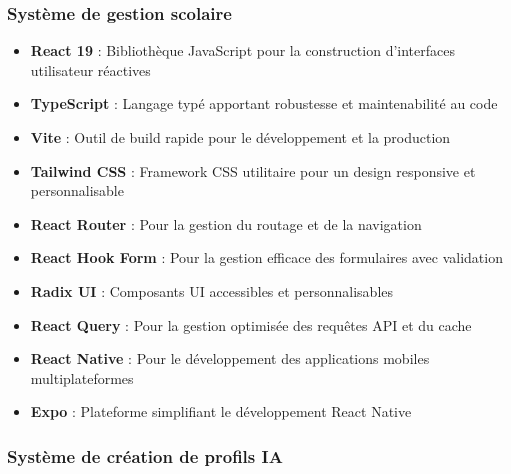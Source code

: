 \subsubsection{Système de gestion scolaire}

\begin{itemize}
  \item \textbf{React 19} : Bibliothèque JavaScript pour la construction d'interfaces utilisateur réactives
  
  \item \textbf{TypeScript} : Langage typé apportant robustesse et maintenabilité au code
  
  \item \textbf{Vite} : Outil de build rapide pour le développement et la production
  
  \item \textbf{Tailwind CSS} : Framework CSS utilitaire pour un design responsive et personnalisable
  
  \item \textbf{React Router} : Pour la gestion du routage et de la navigation
  
  \item \textbf{React Hook Form} : Pour la gestion efficace des formulaires avec validation
  
  \item \textbf{Radix UI} : Composants UI accessibles et personnalisables
  
  \item \textbf{React Query} : Pour la gestion optimisée des requêtes API et du cache
  
  \item \textbf{React Native} : Pour le développement des applications mobiles multiplateformes
  
  \item \textbf{Expo} : Plateforme simplifiant le développement React Native
\end{itemize}

\subsubsection{Système de création de profils IA}

